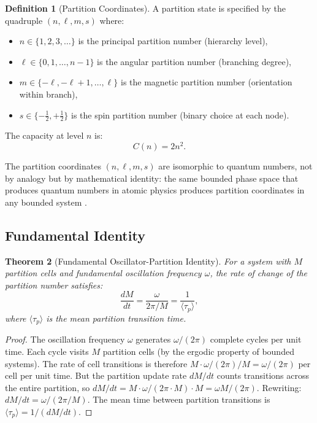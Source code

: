 \documentclass[12pt]{article}
\newtheorem{theorem}{Theorem}[section]
\theoremstyle{definition}
\newtheorem{definition}[theorem]{Definition}
\theoremstyle{remark}
\begin{document}
\begin{definition}[Partition Coordinates]
\label{def:partition_coords}
A partition state is specified by the quadruple $(n, \ell, m, s)$ where:
\begin{itemize}
  \item $n \in \{1, 2, 3, \ldots\}$ is the principal partition number (hierarchy level),
  \item $\ell \in \{0, 1, \ldots, n-1\}$ is the angular partition number (branching degree),
  \item $m \in \{-\ell, -\ell+1, \ldots, \ell\}$ is the magnetic partition number (orientation within branch),
  \item $s \in \{-\tfrac{1}{2}, +\tfrac{1}{2}\}$ is the spin partition number (binary choice at each node).
\end{itemize}
The capacity at level $n$ is:
\begin{equation}
  C(n) = 2n^2.
  \label{eq:capacity}
\end{equation}
\end{definition}

The partition coordinates $(n, \ell, m, s)$ are isomorphic to quantum numbers, not by analogy but by mathematical identity: the same bounded phase space that produces quantum numbers in atomic physics produces partition coordinates in any bounded system \cite{sachikonye2026partition, sachikonye2026single}.

\subsection{Fundamental Identity}

\begin{theorem}[Fundamental Oscillator-Partition Identity]
\label{thm:fundamental_identity}
For a system with $M$ partition cells and fundamental oscillation frequency $\omega$, the rate of change of the partition number satisfies:
\begin{equation}
  \frac{dM}{dt} = \frac{\omega}{2\pi/M} = \frac{1}{\langle \tau_p \rangle},
  \label{eq:fundamental_identity}
\end{equation}
where $\langle \tau_p \rangle$ is the mean partition transition time.
\end{theorem}

\begin{proof}
The oscillation frequency $\omega$ generates $\omega/(2\pi)$ complete cycles per unit time. Each cycle visits $M$ partition cells (by the ergodic property of bounded systems). The rate of cell transitions is therefore $M \cdot \omega/(2\pi) / M = \omega/(2\pi)$ per cell per unit time. But the partition update rate $dM/dt$ counts transitions across the entire partition, so $dM/dt = M \cdot \omega/(2\pi \cdot M) \cdot M = \omega M/(2\pi)$. Rewriting: $dM/dt = \omega/(2\pi/M)$. The mean time between partition transitions is $\langle \tau_p \rangle = 1/(dM/dt)$.
\end{proof}
\end{document}
